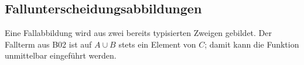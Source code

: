 \documentclass[main.tex]{subfiles}
\begin{document}
\begin{tabproof}
\end{tabproof}

\begin{tabproof}
\end{tabproof}

\subsection{Fallunterscheidungsabbildungen}

Eine Fallabbildung wird aus zwei bereits typisierten Zweigen gebildet. Der
Fallterm aus B02 ist auf \(A\cup B\) stets ein Element von \(C\); damit kann
die Funktion unmittelbar eingeführt werden.
\end{document}
